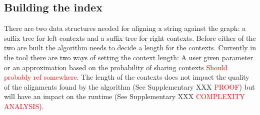 \documentclass{article}
\begin{document}
\subsection{Building the index}
There are two data structures needed for aligning a string against the graph: a suffix tree for left contexts and a suffix tree for right contexts. Before either of the two are built the algorithm needs to decide a length for the contexts. Currently in the tool there are two ways of setting the context length: A user given parameter or an approximation based on the probability of sharing contexts \textcolor{red}{Should probably ref somewhere}. The length of the contexts does not impact the quality of the alignments found by the algorithm (See Supplementary XXX \textcolor{red}{PROOF}) but will have an impact on the runtime (See Supplementary XXX \textcolor{red}{COMPLEXITY ANALYSIS}).\\
\par\noindent
\end{document}
